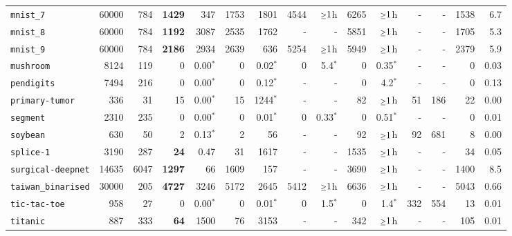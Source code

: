 \begin{tabular}{lccrrrrrrrrrrrr}
\texttt{mnist\_7} & \multicolumn{1}{r}{60000} & \multicolumn{1}{r}{784}  & \textbf{1429} & 347 & 1753 & 1801 & 4544 & $\mathsmaller{\geq}1$h & 6265 & $\mathsmaller{\geq}1$h & - & - & 1538 & 6.7\\
\texttt{mnist\_8} & \multicolumn{1}{r}{60000} & \multicolumn{1}{r}{784}  & \textbf{1192} & 3087 & 2535 & 1762 & - & - & 5851 & $\mathsmaller{\geq}1$h & - & - & 1705 & 5.3\\
\texttt{mnist\_9} & \multicolumn{1}{r}{60000} & \multicolumn{1}{r}{784}  & \textbf{2186} & 2934 & 2639 & 636 & 5254 & $\mathsmaller{\geq}1$h & 5949 & $\mathsmaller{\geq}1$h & - & - & 2379 & 5.9\\
\texttt{mushroom} & \multicolumn{1}{r}{8124} & \multicolumn{1}{r}{119}  & 0 & 0.00$^*$ & 0 & 0.02$^*$ & 0 & 5.4$^*$ & 0 & 0.35$^*$ & - & - & 0 & 0.03\\
\texttt{pendigits} & \multicolumn{1}{r}{7494} & \multicolumn{1}{r}{216}  & 0 & 0.00$^*$ & 0 & 0.12$^*$ & - & - & 0 & 4.2$^*$ & - & - & 0 & 0.13\\
\texttt{primary-tumor} & \multicolumn{1}{r}{336} & \multicolumn{1}{r}{31}  & 15 & 0.00$^*$ & 15 & 1244$^*$ & - & - & 82 & $\mathsmaller{\geq}1$h & 51 & 186 & 22 & 0.00\\
\texttt{segment} & \multicolumn{1}{r}{2310} & \multicolumn{1}{r}{235}  & 0 & 0.00$^*$ & 0 & 0.01$^*$ & 0 & 0.33$^*$ & 0 & 0.51$^*$ & - & - & 0 & 0.01\\
\texttt{soybean} & \multicolumn{1}{r}{630} & \multicolumn{1}{r}{50}  & 2 & 0.13$^*$ & 2 & 56 & - & - & 92 & $\mathsmaller{\geq}1$h & 92 & 681 & 8 & 0.00\\
\texttt{splice-1} & \multicolumn{1}{r}{3190} & \multicolumn{1}{r}{287}  & \textbf{24} & 0.47 & 31 & 1617 & - & - & 1535 & $\mathsmaller{\geq}1$h & - & - & 34 & 0.05\\
\texttt{surgical-deepnet} & \multicolumn{1}{r}{14635} & \multicolumn{1}{r}{6047}  & \textbf{1297} & 66 & 1609 & 157 & - & - & 3690 & $\mathsmaller{\geq}1$h & - & - & 1400 & 8.5\\
\texttt{taiwan\_binarised} & \multicolumn{1}{r}{30000} & \multicolumn{1}{r}{205}  & \textbf{4727} & 3246 & 5172 & 2645 & 5412 & $\mathsmaller{\geq}1$h & 6636 & $\mathsmaller{\geq}1$h & - & - & 5043 & 0.66\\
\texttt{tic-tac-toe} & \multicolumn{1}{r}{958} & \multicolumn{1}{r}{27}  & 0 & 0.00$^*$ & 0 & 0.01$^*$ & 0 & 1.5$^*$ & 0 & 1.4$^*$ & 332 & 554 & 13 & 0.01\\
\texttt{titanic} & \multicolumn{1}{r}{887} & \multicolumn{1}{r}{333}  & \textbf{64} & 1500 & 76 & 3153 & - & - & 342 & $\mathsmaller{\geq}1$h & - & - & 105 & 0.01\\

\end{tabular}
